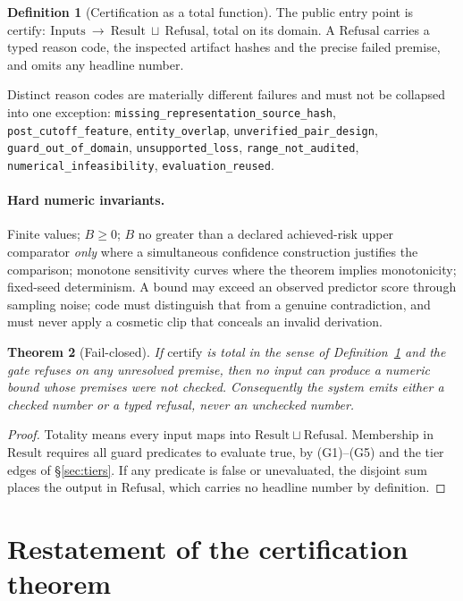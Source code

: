 \documentclass[11pt,a4paper]{article}
\newtheorem{theorem}{Theorem}[section]
\theoremstyle{definition}
\newtheorem{definition}[theorem]{Definition}
\theoremstyle{remark}
\newcommand{\code}[1]{\texttt{\small#1}}
\begin{document}
\begin{definition}[Certification as a total function]\label{def:refusal}
The public entry point is
$\mathrm{certify}:\ \text{Inputs}\ \longrightarrow\ \mathrm{Result}\ \sqcup\ \mathrm{Refusal}$,
total on its domain. A $\mathrm{Refusal}$ carries a typed reason code, the inspected artifact hashes and the precise failed premise, and omits any headline number.
\end{definition}

Distinct reason codes are materially different failures and must not be collapsed into one exception:
\code{missing\_representation\_source\_hash}, \code{post\_cutoff\_feature}, \code{entity\_overlap}, \code{unverified\_pair\_design}, \code{guard\_out\_of\_domain}, \code{unsupported\_loss}, \code{range\_not\_audited}, \code{numerical\_infeasibility}, \code{evaluation\_reused}.

\paragraph{Hard numeric invariants.} Finite values; $B\ge0$; $B$ no greater than a declared achieved-risk upper comparator \emph{only} where a simultaneous confidence construction justifies the comparison; monotone sensitivity curves where the theorem implies monotonicity; fixed-seed determinism. A bound may exceed an observed predictor score through sampling noise; code must distinguish that from a genuine contradiction, and must never apply a cosmetic clip that conceals an invalid derivation.

\begin{theorem}[Fail-closed]\label{thm:failclosed}
If $\mathrm{certify}$ is total in the sense of Definition~\ref{def:refusal} and the gate refuses on any unresolved premise, then no input can produce a numeric bound whose premises were not checked. Consequently the system emits either a checked number or a typed refusal, never an unchecked number.
\end{theorem}
\begin{proof}
Totality means every input maps into $\mathrm{Result}\sqcup\mathrm{Refusal}$. Membership in $\mathrm{Result}$ requires all guard predicates to evaluate true, by (G1)--(G5) and the tier edges of \S\ref{sec:tiers}. If any predicate is false or unevaluated, the disjoint sum places the output in $\mathrm{Refusal}$, which carries no headline number by definition. \end{proof}

\section{Restatement of the certification theorem}\label{sec:restate}
\end{document}
